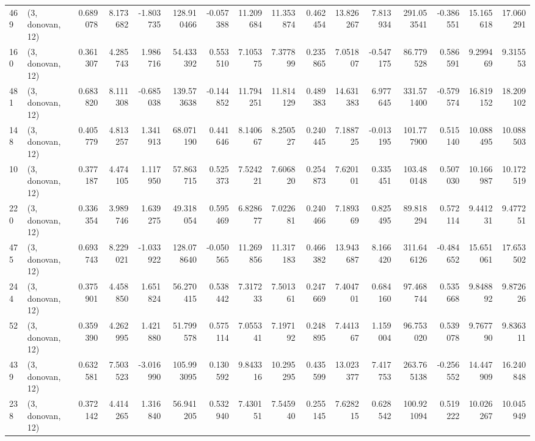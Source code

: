 \begin{tabular}{llrrrrrrrrrrrrrr}
469 &  (3, donovan, 12) &   0.689078 &   8.173682 &  -1.803735 &   128.910466 &  -0.057388 &  11.209684 &  11.353874 &  0.462454 &  13.826267 &   7.813934 &    291.053541 &   -0.386551 &   15.165618 &   17.060291 \\
160 &  (3, donovan, 12) &   0.361307 &   4.285743 &   1.986716 &    54.433392 &   0.553510 &   7.105375 &   7.377899 &  0.235865 &   7.051807 &  -0.547175 &     86.779528 &    0.586591 &    9.299469 &    9.315553 \\
481 &  (3, donovan, 12) &   0.683820 &   8.111308 &  -0.685038 &   139.573638 &  -0.144852 &  11.794251 &  11.814129 &  0.489383 &  14.631383 &   6.977645 &    331.571400 &   -0.579574 &   16.819152 &   18.209102 \\
148 &  (3, donovan, 12) &   0.405779 &   4.813257 &   1.341913 &    68.071190 &   0.441646 &   8.140667 &   8.250527 &  0.240445 &   7.188725 &  -0.013195 &    101.777900 &    0.515140 &   10.088495 &   10.088503 \\
10  &  (3, donovan, 12) &   0.377187 &   4.474105 &   1.117950 &    57.863715 &   0.525373 &   7.524221 &   7.606820 &  0.254873 &   7.620101 &   0.335451 &    103.480148 &    0.507030 &   10.166987 &   10.172519 \\
220 &  (3, donovan, 12) &   0.336354 &   3.989746 &   1.639275 &    49.318054 &   0.595469 &   6.828677 &   7.022681 &  0.240466 &   7.189369 &   0.825495 &     89.818294 &    0.572114 &    9.441231 &    9.477251 \\
475 &  (3, donovan, 12) &   0.693743 &   8.229021 &  -1.033922 &   128.078640 &  -0.050565 &  11.269856 &  11.317183 &  0.466382 &  13.943687 &   8.166420 &    311.646126 &   -0.484652 &   15.651061 &   17.653502 \\
244 &  (3, donovan, 12) &   0.375901 &   4.458850 &   1.651824 &    56.270415 &   0.538442 &   7.317233 &   7.501361 &  0.247669 &   7.404701 &   0.684160 &     97.468744 &    0.535668 &    9.848892 &    9.872626 \\
52  &  (3, donovan, 12) &   0.359390 &   4.262995 &   1.421880 &    51.799578 &   0.575114 &   7.055341 &   7.197192 &  0.248895 &   7.441367 &   1.159004 &     96.753020 &    0.539078 &    9.767790 &    9.836311 \\
439 &  (3, donovan, 12) &   0.632581 &   7.503523 &  -3.016990 &   105.993095 &   0.130592 &   9.843316 &  10.295295 &  0.435599 &  13.023377 &   7.417753 &    263.765138 &   -0.256552 &   14.447909 &   16.240848 \\
238 &  (3, donovan, 12) &   0.372142 &   4.414265 &   1.316840 &    56.941205 &   0.532940 &   7.430151 &   7.545940 &  0.255145 &   7.628215 &   0.628542 &    100.921094 &    0.519222 &   10.026267 &   10.045949 \\

\end{tabular}

